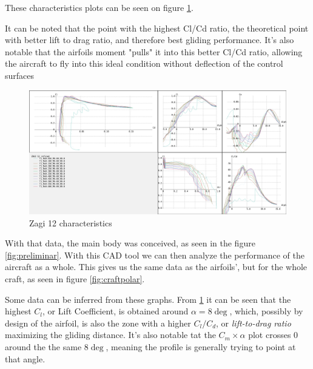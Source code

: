 These characteristics plots can be seen on figure \ref{fig:zagi12polares}.
%

It can be noted that the point with the highest Cl/Cd ratio, the theoretical point with better lift to drag ratio, and therefore best gliding performance. It's also notable that the airfoils moment "pulls" it into this better Cl/Cd ratio, allowing the aircraft to fly into this ideal condition without deflection of the control surfaces


\begin{figure}
\centering
  \includegraphics[width=\linewidth]{figs/polares.png}
  \caption{Zagi 12 characteristics}
  \label{fig:zagi12polares}
\end{figure}

With that data, the main body was conceived, as seen in the figure \ref{fig:preliminar}. With this CAD tool we can then analyze the performance of the aircraft as a whole. This gives us the same data as the airfoils', but for the whole craft, as seen in figure \ref{fig:craftpolar}.

Some data can be inferred from these graphs. From \ref{fig:zagi12polares} it can be seen that the highest $C_l$, or Lift Coefficient, is obtained around $\alpha = 8\deg$, which, possibly by design of the airfoil, is also the zone with a higher $C_l/C_d$, or \textit{lift-to-drag ratio} maximizing the gliding distance. It's also notable tat the $C_m  \times \alpha$ plot crosses 0 around the the same $8\deg$, meaning the profile is generally trying to point at that angle.

